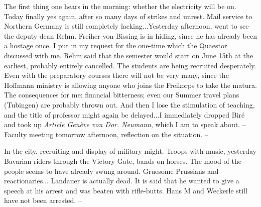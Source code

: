 
The first thing one hears in the morning: whether the electricity will be on. Today finally yes again, after so many days of strikes and unrest. Mail service to Northern Germany is still completely lacking...Yesterday afternoon, went to see the deputy dean Rehm. Freiher von Bissing is in hiding, since he has already been a hostage once. I put in my request for the one-time  which the Quaestor discussed with me. Rehm said that the semester would start on June 15th at the earliest, probably entirely cancelled. The students are being recruited desperately. Even with the preparatory courses there will not be very many, since the Hoffmann ministry is allowing anyone who joins the Freikorps to take the matura. The consequences for me: financial bitterness; even our Summer travel plans (Tubingen) are probably thrown out. And then I lose the stimulation of teaching, and the title of professor might again be delayed...I immediately dropped Biré and took up \textit{Article Genève von Dor. Neumann}, which I am to speak about. -- Faculty meeting tomorrow afternoon, reflection on the situation. --

In the city, recruiting and display of military might. Troops with music, yesterday Bavarian riders through the Victory Gate, bands on horses. The mood of the people seems to have already swung around. Gruesome Prussians and reactionaries... Landauer is actually dead. It is said that he wanted to give a speech at his arrest and was beaten with rifle-butts. Hans M and Weckerle still have not been arrested. --

